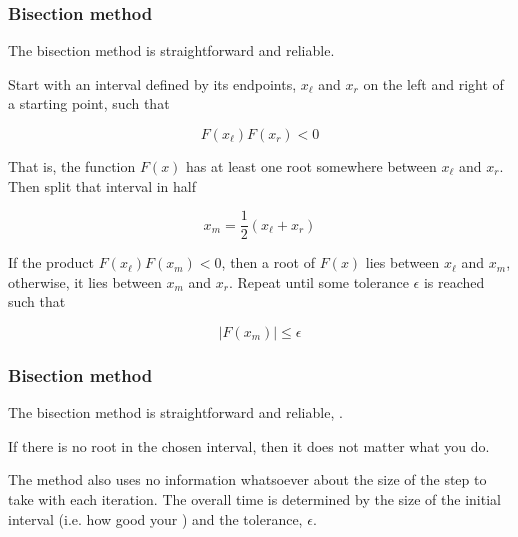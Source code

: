 \documentclass[hyperref={colorlinks=true}]{beamer}
\begin{document}
\begin{frame}%
  \frametitle{Bisection method}

  The bisection method is straightforward and reliable.
  
  \mysp 
  
  Start with an interval defined by its endpoints, $x_{\ell}$ and $x_{r}$ on the left and right of a starting point, such that
  
  \begin{equation}
    F(x_{\ell})F(x_{r}) < 0
  \end{equation}
  
  That is, the function $F(x)$ has at least one root somewhere between $x_{\ell}$ and $x_{r}$. Then split that interval in half
  
  \begin{equation}
    x_m = \frac{1}{2}(x_{\ell} + x_{r})
  \end{equation}
  
  If the product $F(x_{\ell})F(x_{m}) < 0$, then a root of $F(x)$ lies between $x_{\ell}$ and $x_{m}$, otherwise, it lies between $x_{m}$ and $x_{r}$. Repeat until some tolerance $\epsilon$ is reached such that
  
  \begin{equation}
   | F(x_{m}) | \leq \epsilon
  \end{equation}
  
\end{frame}


\begin{frame}%
  \frametitle{Bisection method}

  The bisection method is straightforward and reliable, .
  
  \mysp 
  
  If there is no root in the chosen interval, then it does not matter what you do.
  
  \mysp
  
  The method also uses no information whatsoever about the size of the step to take with each iteration. The overall time is determined  by the size of the initial interval (i.e. how good your ) and the tolerance, $\epsilon$.
  
  \mysp
  
  \pause
  
  \centering {}
  
\end{frame}
\end{document}
